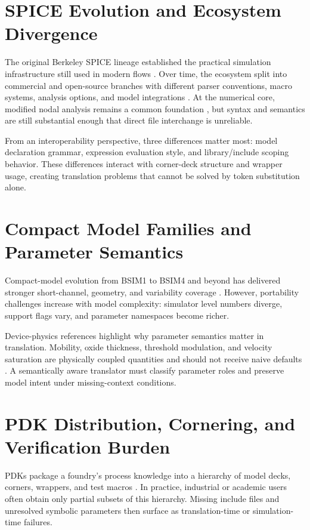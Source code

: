 \documentclass[12pt,a4paper,oneside]{report}
\begin{document}
\section{SPICE Evolution and Ecosystem Divergence}
The original Berkeley SPICE lineage established the practical simulation infrastructure still used in modern flows \cite{spice70,spice3,spicebook,vladimirescu}. Over time, the ecosystem split into commercial and open-source branches with different parser conventions, macro systems, analysis options, and model integrations \cite{kundert,ngspice_ref,spectre_ref,hspice_ref,hspice_manual}. At the numerical core, modified nodal analysis remains a common foundation \cite{mna}, but syntax and semantics are still substantial enough that direct file interchange is unreliable.

From an interoperability perspective, three differences matter most: model declaration grammar, expression evaluation style, and library/include scoping behavior. These differences interact with corner-deck structure and wrapper usage, creating translation problems that cannot be solved by token substitution alone.

\section{Compact Model Families and Parameter Semantics}
Compact-model evolution from BSIM1 to BSIM4 and beyond has delivered stronger short-channel, geometry, and variability coverage \cite{bsim1,bsim2,bsim3,bsim4,bsimsoi,bsimcmg,bsimimg,ekv_model}. However, portability challenges increase with model complexity: simulator level numbers diverge, support flags vary, and parameter namespaces become richer.

Device-physics references highlight why parameter semantics matter in translation. Mobility, oxide thickness, threshold modulation, and velocity saturation are physically coupled quantities and should not receive naive defaults \cite{mos_modeling,semiconductor_physics,baker,rabaey}. A semantically aware translator must classify parameter roles and preserve model intent under missing-context conditions.

\section{PDK Distribution, Cornering, and Verification Burden}
PDKs package a foundry's process knowledge into a hierarchy of model decks, corners, wrappers, and test macros \cite{pdk_method,pdk_variation,corner_analysis,mc_analysis}. In practice, industrial or academic users often obtain only partial subsets of this hierarchy. Missing include files and unresolved symbolic parameters then surface as translation-time or simulation-time failures.
\end{document}
